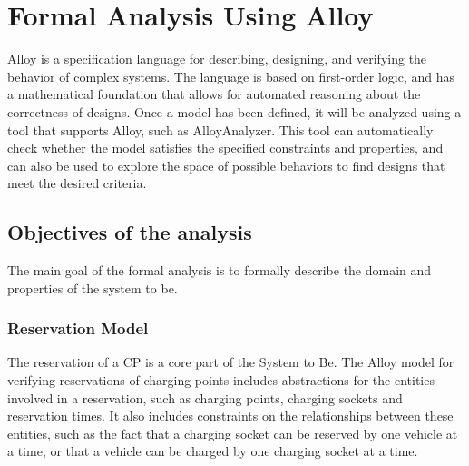 \section{Formal Analysis Using Alloy}
Alloy is a specification language for describing, designing, and verifying the behavior of complex systems.
The language is based on first-order logic, and has a mathematical foundation that allows for automated reasoning
about the correctness of designs.
Once a model has been defined, it will be analyzed using a tool that supports Alloy, such as AlloyAnalyzer. This tool can automatically check
whether the model satisfies the specified constraints and properties, and can also be used to explore the space of
possible behaviors to find designs that meet the desired criteria.

\subsection{Objectives of the analysis}
The main goal of the formal analysis is to formally describe the domain and properties of the system to be.

\subsubsection{Reservation Model}
The reservation of a CP is a core part of the System to Be.
The Alloy model for verifying reservations of charging points includes abstractions
for the entities involved in a reservation, such as charging points, charging sockets and reservation times.
It also includes constraints on the relationships between these entities, such as the fact that a charging socket
can be reserved by one vehicle at a time, or that a vehicle can be charged by one charging socket at a time.

